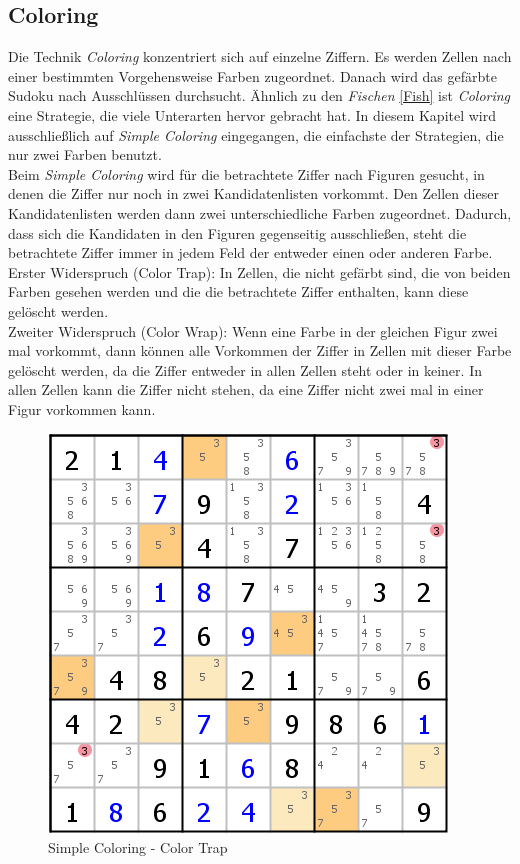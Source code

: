 \newpage
\subsection{Coloring}
\label{Coloring}
Die Technik \textit{Coloring} konzentriert sich auf einzelne Ziffern. Es werden Zellen nach einer bestimmten Vorgehensweise Farben zugeordnet. Danach wird das gefärbte Sudoku nach Ausschlüssen durchsucht. Ähnlich zu den \textit{Fischen} \ref{Fish} ist \textit{Coloring} eine Strategie, die viele Unterarten hervor gebracht hat. In diesem Kapitel wird ausschließlich auf \textit{Simple Coloring} eingegangen, die einfachste der Strategien, die nur zwei Farben benutzt.\\
Beim \textit{Simple Coloring} wird für die betrachtete Ziffer nach Figuren gesucht, in denen die Ziffer nur noch in zwei Kandidatenlisten vorkommt. Den Zellen dieser Kandidatenlisten werden dann zwei unterschiedliche Farben zugeordnet. Dadurch, dass sich die Kandidaten in den Figuren gegenseitig ausschließen, steht die betrachtete Ziffer immer in jedem Feld der entweder einen oder anderen Farbe.\\ 
Erster Widerspruch (Color Trap): In Zellen, die nicht gefärbt sind, die von beiden Farben gesehen werden und die die betrachtete Ziffer enthalten, kann diese gelöscht werden.\\
Zweiter Widerspruch (Color Wrap): Wenn eine Farbe in der gleichen Figur zwei mal vorkommt, dann können alle Vorkommen der Ziffer in Zellen mit dieser Farbe gelöscht werden, da die Ziffer entweder in allen Zellen steht oder in keiner. In allen Zellen kann die Ziffer nicht stehen, da eine Ziffer nicht zwei mal in einer Figur vorkommen kann.

\begin{figure}[h]
\begin{center}
\includegraphics{./img/simple_coloring.png}
\caption{Simple Coloring - Color Trap}
\end{center}
\end{figure}

